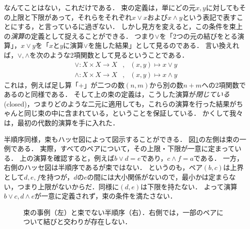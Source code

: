 \documentclass[11pt,a4paper, dvipdfmx]{jsarticle}
\begin{document}
なんてことはない，これだけである．
束の定義は，単にどの元$x, y$に対してもその上限と下限があって，それらをそれぞれ$x \vee x$および$x \wedge y$という表記で表すことにする，と言っているに過ぎない．
しかし見方を変えると，この条件を束上の\emph{演算}の定義として捉えることができる．
つまり$\vee$を「2つの元の結びをとる演算」，$x \vee y$を「$x$と$y$に演算$\vee$を施した結果」として見るのである．
言い換えれば，$\vee, \wedge$を次のような2項関数として見るということである．
\begin{align*}
 \vee: X \times X \to X &, \ \ \ (x, y) \mapsto x \vee y \\
 \wedge: X \times X \to X &, \ \ \ (x, y) \mapsto x \wedge y 
\end{align*}
これは，例えば足し算「+」が二つの数$(n, m)$から別の数$n + m$への2項関数であるのと同様である．
そして上の束の定義は，こうした演算が\emph{閉じている}(closed)，つまりどのような二元に適用しても，これらの演算を行った結果がちゃんと同じ束の中に含まれている，ということを保証している．
かくして我々は，最初の代数的演算を手に入れた．

半順序同様，束もハッセ図によって図示することができる．
図\ref{fig:lattice}の左側は束の一例である．
実際，すべてのペアについて，その上限・下限が一意に定まっている．
上の演算を確認すると，例えば$b\vee d = e$であり，$c \wedge f = a$である．
一方，右側のハッセ図は半順序であるが束ではない．
というのも，ペア$(b, c)$は上界として$d, e, f$を持つが，$d$の$e$の間には大小関係がないので，最小かは定まらない，つまり上限がないからだ．同様に$(d, e)$は下限を持たない．
よって演算$b \vee c, d \wedge e$が一意に定義されず，束の条件を満たさない．
\begin{figure}[h]
    \centering
    \caption{束の事例（左）と束でない半順序（右）．右側では，一部のペアについて結びと交わりが存在しない．}
    \label{fig:lattice}
\end{figure}
\end{document}
